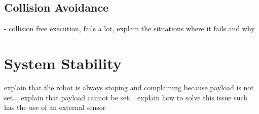 \subsection{Collision Avoidance}

\par - collision free execution, fails a lot, explain the situations where it fails and why

\section{System Stability}

\par explain that the robot is always stoping and complaining because payload is not set... explain that payload cannot be set... explain how to solve this issue such has the use of an external sensor